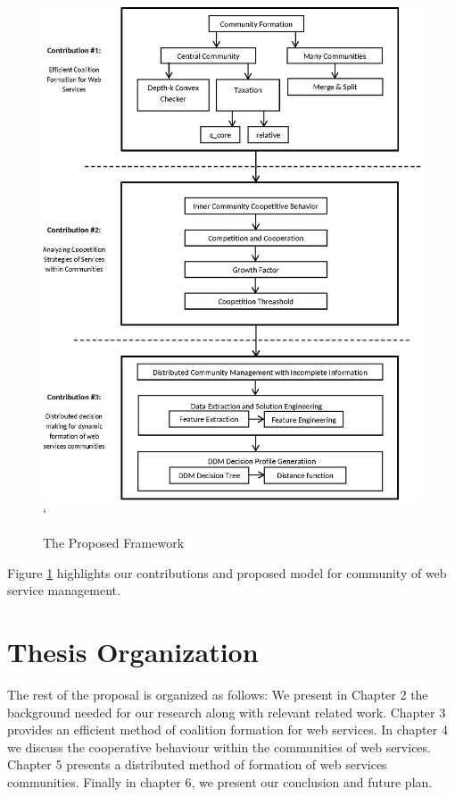 \begin{figure}[!t]
\centering
\includegraphics[width=6in]{Figures/structure.eps}`
\caption{The Proposed Framework}
\label{fig_structure}
\end{figure}

Figure \ref{fig_structure} highlights our contributions and proposed model for community of web service management.

\section{Thesis Organization}\label{sec:outline}
The rest of the proposal is organized as follows: We present in Chapter 2 the background needed for our research along with relevant related work. Chapter 3 provides an efficient method of coalition formation for web services. In chapter 4 we discuss the cooperative behaviour within the communities of web services. Chapter 5 presents a distributed method of formation of web services communities. Finally in chapter 6, we present our conclusion and future plan.


